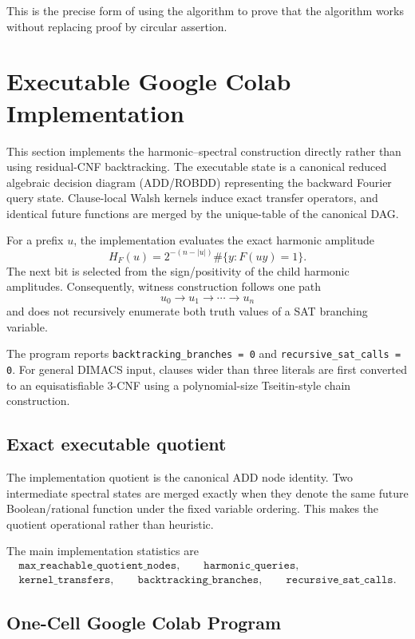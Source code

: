 \documentclass[11pt]{article}
\theoremstyle{plain}
\theoremstyle{definition}
\begin{document}
This is the precise form of using the algorithm to prove that the algorithm
works without replacing proof by circular assertion.


\section{Executable Google Colab Implementation}
\label{sec:colab-implementation}

This section implements the harmonic--spectral construction directly rather
than using residual-CNF backtracking.  The executable state is a canonical
reduced algebraic decision diagram (ADD/ROBDD) representing the backward
Fourier query state.  Clause-local Walsh kernels induce exact transfer
operators, and identical future functions are merged by the unique-table of
the canonical DAG.

For a prefix \(u\), the implementation evaluates the exact harmonic amplitude
\[
    H_F(u)
    =
    2^{-(n-|u|)}
    \#\{y:F(uy)=1\}.
\]
The next bit is selected from the sign/positivity of the child harmonic
amplitudes.  Consequently, witness construction follows one path
\[
    u_0\to u_1\to\cdots\to u_n
\]
and does not recursively enumerate both truth values of a SAT branching
variable.

The program reports
\texttt{backtracking\_branches = 0} and
\texttt{recursive\_sat\_calls = 0}.  For general DIMACS input, clauses wider
than three literals are first converted to an equisatisfiable 3-CNF using a
polynomial-size Tseitin-style chain construction.

\subsection{Exact executable quotient}

The implementation quotient is the canonical ADD node identity.  Two
intermediate spectral states are merged exactly when they denote the same
future Boolean/rational function under the fixed variable ordering.  This
makes the quotient operational rather than heuristic.

The main implementation statistics are
\[
\begin{gathered}
\texttt{max\_reachable\_quotient\_nodes},\qquad
\texttt{harmonic\_queries},\\
\texttt{kernel\_transfers},\qquad
\texttt{backtracking\_branches},\qquad
\texttt{recursive\_sat\_calls}.
\end{gathered}
\]

\subsection{One-Cell Google Colab Program}
\end{document}
